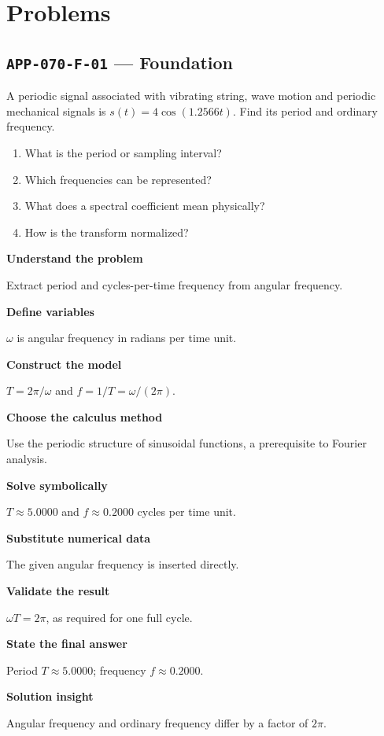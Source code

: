 \documentclass[11pt]{book}
\newcommand{\pid}[1]{\texttt{#1}}
\begin{document}
\section*{Problems}
\subsection*{\pid{APP-070-F-01} — Foundation}
\begin{problembox}
A periodic signal associated with vibrating string, wave motion and periodic mechanical signals is $s(t)=4\cos(1.2566t)$. Find its period and ordinary frequency.
\end{problembox}
\begin{promptbox}\begin{enumerate}
\item What is the period or sampling interval?
\item Which frequencies can be represented?
\item What does a spectral coefficient mean physically?
\item How is the transform normalized?
\end{enumerate}\end{promptbox}
\begin{solutionbox}
\textbf{Understand the problem}\par Extract period and cycles-per-time frequency from angular frequency.\par\medskip
\textbf{Define variables}\par $\omega$ is angular frequency in radians per time unit.\par\medskip
\textbf{Construct the model}\par $T=2\pi/\omega$ and $f=1/T=\omega/(2\pi)$.\par\medskip
\textbf{Choose the calculus method}\par Use the periodic structure of sinusoidal functions, a prerequisite to Fourier analysis.\par\medskip
\textbf{Solve symbolically}\par $T\approx 5.0000$ and $f\approx 0.2000$ cycles per time unit.\par\medskip
\textbf{Substitute numerical data}\par The given angular frequency is inserted directly.\par\medskip
\textbf{Validate the result}\par $\omega T=2\pi$, as required for one full cycle.\par\medskip
\textbf{State the final answer}\par Period $T\approx 5.0000$; frequency $f\approx 0.2000$.\par\medskip
\textbf{Solution insight}\par Angular frequency and ordinary frequency differ by a factor of $2\pi$.\par\medskip
\end{solutionbox}
\end{document}
